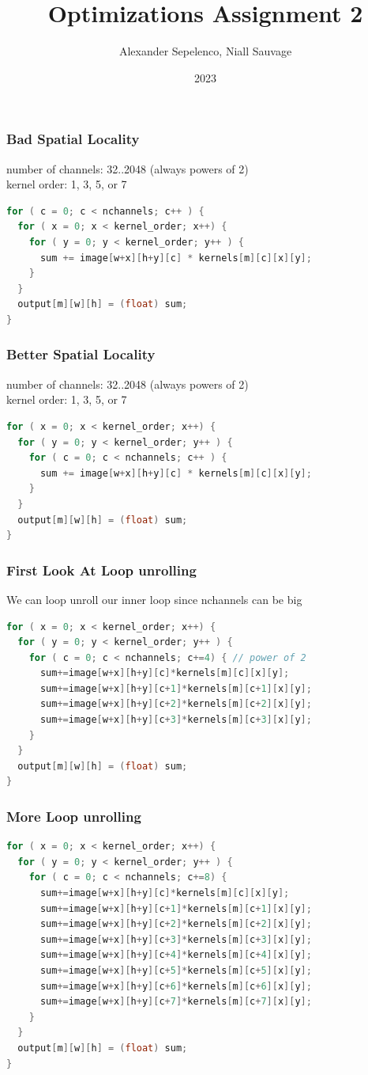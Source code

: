 \documentclass{beamer}
\title{Optimizations Assignment 2}
\author{Alexander Sepelenco, Niall Sauvage}
\date{2023}
\begin{document}
\frame{\titlepage}

\begin{frame}[fragile]
\frametitle{Bad Spatial Locality}
number of channels: 32..2048 (always powers of 2) \\
kernel order: 1, 3, 5, or 7
\begin{lstlisting}[language=C,keywordstyle=\color{blue}]
for ( c = 0; c < nchannels; c++ ) {
  for ( x = 0; x < kernel_order; x++) {
    for ( y = 0; y < kernel_order; y++ ) {
      sum += image[w+x][h+y][c] * kernels[m][c][x][y];
    }
  }
  output[m][w][h] = (float) sum;
}
\end{lstlisting}
\end{frame}

\begin{frame}[fragile]
\frametitle{Better Spatial Locality}
number of channels: 32..2048 (always powers of 2) \\
kernel order: 1, 3, 5, or 7
\begin{lstlisting}[language=C,keywordstyle=\color{blue}]
for ( x = 0; x < kernel_order; x++) {
  for ( y = 0; y < kernel_order; y++ ) {
    for ( c = 0; c < nchannels; c++ ) {
      sum += image[w+x][h+y][c] * kernels[m][c][x][y];
    }
  }
  output[m][w][h] = (float) sum;
}
\end{lstlisting}
\end{frame}

\begin{frame}[fragile]
\frametitle{First Look At Loop unrolling}
We can loop unroll our inner loop since nchannels can be big
\begin{lstlisting}[language=C,keywordstyle=\color{blue}]
for ( x = 0; x < kernel_order; x++) {
  for ( y = 0; y < kernel_order; y++ ) {
    for ( c = 0; c < nchannels; c+=4) { // power of 2 
      sum+=image[w+x][h+y][c]*kernels[m][c][x][y];
      sum+=image[w+x][h+y][c+1]*kernels[m][c+1][x][y];
      sum+=image[w+x][h+y][c+2]*kernels[m][c+2][x][y];
      sum+=image[w+x][h+y][c+3]*kernels[m][c+3][x][y];
    }
  }
  output[m][w][h] = (float) sum;
}
\end{lstlisting}
\end{frame}

\begin{frame}[fragile]
\frametitle{More Loop unrolling}
\begin{lstlisting}[language=C,keywordstyle=\color{blue}]
for ( x = 0; x < kernel_order; x++) {
  for ( y = 0; y < kernel_order; y++ ) {
    for ( c = 0; c < nchannels; c+=8) {
      sum+=image[w+x][h+y][c]*kernels[m][c][x][y];
      sum+=image[w+x][h+y][c+1]*kernels[m][c+1][x][y];
      sum+=image[w+x][h+y][c+2]*kernels[m][c+2][x][y];
      sum+=image[w+x][h+y][c+3]*kernels[m][c+3][x][y];
      sum+=image[w+x][h+y][c+4]*kernels[m][c+4][x][y];
      sum+=image[w+x][h+y][c+5]*kernels[m][c+5][x][y];
      sum+=image[w+x][h+y][c+6]*kernels[m][c+6][x][y];
      sum+=image[w+x][h+y][c+7]*kernels[m][c+7][x][y];
    }
  }
  output[m][w][h] = (float) sum;
}
\end{lstlisting}
\end{frame}
\end{document}
